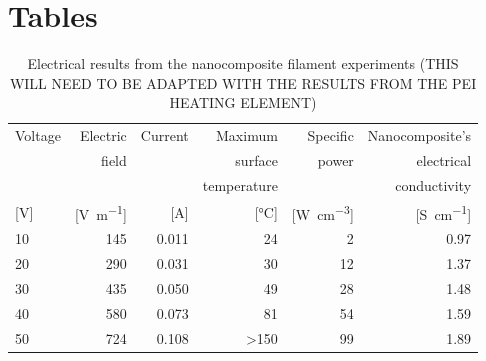 \documentclass[11pt,review,times]{elsarticle}
\begin{document}
\FloatBarrier
\clearpage
							\section*{Tables}
\FloatBarrier

\begin{table}[h]
\centering
\begin{tabular}{@{}lrrrrr@{}}
\toprule
Voltage 			& Electric					& Current 			& Maximum  					& Specific   						& Nanocomposite's \\ 
 					& field						&  						& surface 					& power   							& electrical \\ 
 					& 								&  						& temperature 				&    									& conductivity \\
{[}\si{\V}{]} 	& {[}\si{\V\per\m}{]} 	& {[}\si{\A}{]} 	& {[}\si{\celsius}{]} 	& {[}\si{\W\per\cubic\cm}{]}	& {[}\si{\siemens\per\cm}{]} \\ \midrule
10 					& 145							& 0.011 				& 24 							& 2		  								& 0.97 \\
20					& 290							& 0.031 				& 30 							& 12	 								& 1.37 \\
30 					& 435							& 0.050 				& 49 							& 28	 								& 1.48 \\
40 					& 580							& 0.073 				& 81 							& 54	 								& 1.59 \\
50 					& 724							& 0.108 				& \textgreater 150 		& 99	 								& 1.89 \\ \bottomrule
\end{tabular}%
\caption{Electrical results from the nanocomposite filament experiments (THIS WILL NEED TO BE ADAPTED WITH THE RESULTS FROM THE PEI HEATING ELEMENT)}
\label{tab:results_lab}
\end{table}
\end{document}
